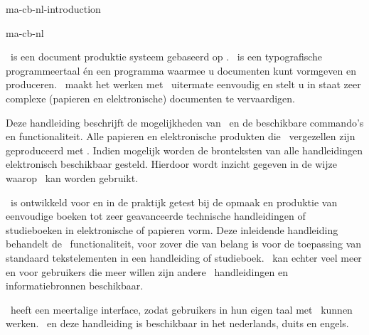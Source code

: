 \startonderdeel ma-cb-nl-introduction

\produkt ma-cb-nl

\CONTEXT\ is een document produktie systeem gebaseerd op
\TEX. \TEX\ is een typografische programmeertaal \'en een
programma waarmee u documenten kunt vormgeven en produceren.
\CONTEXT\ maakt het werken met \TEX\ uitermate eenvoudig en
stelt u in staat zeer complexe (papieren en elektronische)
documenten te vervaardigen.

Deze handleiding beschrijft de mogelijkheden van \CONTEXT\
en de beschikbare commando's en functionaliteit. \voetnoot
{Alle papieren en elektronische produkten die \CONTEXT\
vergezellen zijn geproduceerd met \CONTEXT. Indien mogelijk
worden de bronteksten van alle handleidingen elektronisch
beschikbaar gesteld. Hierdoor wordt inzicht gegeven in de
wijze waarop \CONTEXT\ kan worden gebruikt.}

\CONTEXT\ is ontwikkeld voor en in de praktijk getest bij de
opmaak en produktie van eenvoudige boeken tot zeer
geavanceerde technische handleidingen of studieboeken in
elektronische of papieren vorm. Deze inleidende handleiding
behandelt de \CONTEXT\ functionaliteit, voor zover die van
belang is voor de toepassing van standaard tekstelementen in
een handleiding of studieboek. \CONTEXT\ kan echter veel
meer en voor gebruikers die meer willen zijn andere
\CONTEXT\ handleidingen en informatiebronnen beschikbaar.

\CONTEXT\ heeft een meertalige interface, zodat gebruikers
in hun eigen taal met \CONTEXT\ kunnen werken. \CONTEXT\ en
deze handleiding is beschikbaar in het nederlands, duits en
engels.

\stoponderdeel
